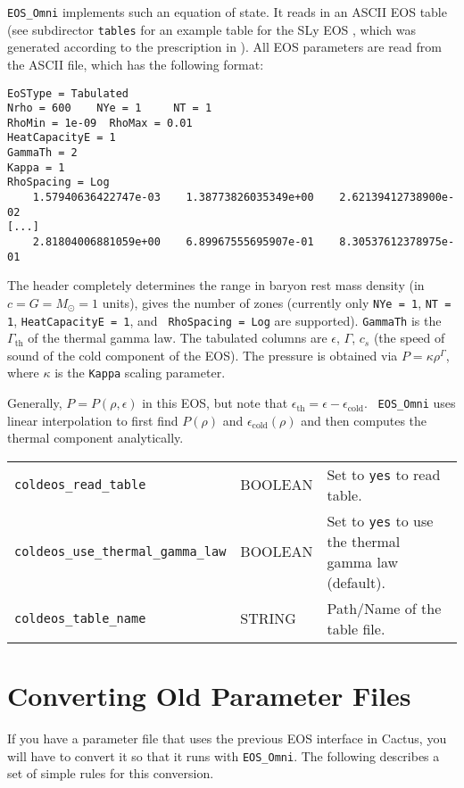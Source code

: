 {\tt EOS\_Omni} implements such an equation of state. It reads in an
ASCII EOS table (see subdirector {\tt tables} for an example table for
the SLy EOS \cite{douchin:01,haensel:04}, which was generated
according to the prescription in \cite{shibata:05,corvino:10}). All
EOS parameters are read from the ASCII file, which has the following
format:

\begin{verbatim}
EoSType = Tabulated
Nrho = 600    NYe = 1     NT = 1
RhoMin = 1e-09  RhoMax = 0.01
HeatCapacityE = 1
GammaTh = 2
Kappa = 1
RhoSpacing = Log
    1.57940636422747e-03    1.38773826035349e+00    2.62139412738900e-02
[...]
    2.81804006881059e+00    6.89967555695907e-01    8.30537612378975e-01
\end{verbatim}

The header completely determines the range in baryon rest mass density
(in $c=G=M_\odot=1$ units), gives the number of zones (currently only
{\tt NYe = 1}, {\tt NT = 1}, {\tt HeatCapacityE = 1}, and {\tt
  RhoSpacing = Log} are supported). {\tt GammaTh} is the
$\Gamma_\mathrm{th}$ of the thermal gamma law. The tabulated columns
are $\epsilon$, $\Gamma$, $c_s$ (the speed of sound of the cold
component of the EOS). The pressure is obtained via $P= \kappa
\rho^\Gamma$, where $\kappa$ is the {\tt Kappa} scaling parameter.

Generally, $P = P(\rho,\epsilon)$ in this EOS, but note that
$\epsilon_\mathrm{th} = \epsilon - \epsilon_\mathrm{cold}$. {\tt
  EOS\_Omni} uses linear interpolation to first find $P(\rho)$ and
$\epsilon_\mathrm{cold}(\rho)$ and then computes the thermal component
analytically.


\begin{tabular}{lll}
\texttt{coldeos\_read\_table}& BOOLEAN & Set to {\tt yes} to read table.\\
\texttt{coldeos\_use\_thermal\_gamma\_law}& BOOLEAN & Set to {\tt yes} to use the thermal
gamma law (default).\\
\texttt{coldeos\_table\_name}& STRING & Path/Name of the table file.\\
\end{tabular}


\section{Converting Old Parameter Files}

If you have a parameter file that uses the previous EOS interface in
Cactus, you will have to convert it so that it runs with
\texttt{EOS\_Omni}. The following describes a set of simple rules for
this conversion.

